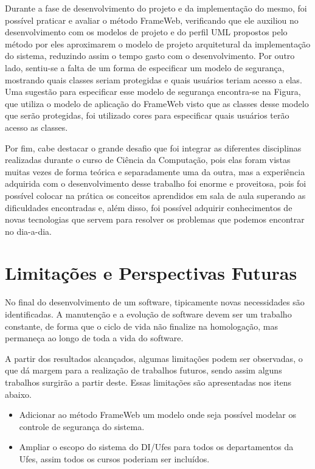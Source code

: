 Durante a fase de desenvolvimento do projeto e da implementação do mesmo, foi possível praticar e avaliar o método FrameWeb, verificando que ele auxiliou no desenvolvimento com os modelos de projeto e do perfil UML propostos pelo método por eles aproximarem o modelo de projeto arquitetural da implementação do sistema, reduzindo assim o tempo gasto com o desenvolvimento. Por outro lado, sentiu-se a falta de um forma de especificar um modelo de segurança, mostrando quais classes seriam protegidas e quais usuários teriam acesso a elas. Uma sugestão para especificar esse modelo de segurança encontra-se na Figura, que utiliza o modelo de aplicação do FrameWeb visto que as classes desse modelo que serão protegidas, foi utilizado cores para especificar quais usuários terão acesso as classes.


Por fim, cabe destacar o grande desafio que foi integrar as diferentes disciplinas realizadas durante o curso de Ciência da Computação, pois elas foram vistas muitas vezes de forma teórica e separadamente uma da outra, mas a experiência adquirida com o desenvolvimento desse trabalho foi enorme e proveitosa, pois foi possível colocar na prática os conceitos aprendidos em sala de aula superando as dificuldades encontradas e, além disso, foi possível adquirir conhecimentos de novas tecnologias que servem para resolver os problemas que podemos encontrar no dia-a-dia.




\section{Limitações e Perspectivas Futuras}
\label{sec-consideracoes-finais-limitacoes-perspectivas}

No final do desenvolvimento de um software, tipicamente novas necessidades são identificadas. A manutenção e a evolução de software devem ser um trabalho constante, de forma que o ciclo de vida não finalize na homologação, mas permaneça ao longo de toda a vida do software.

A partir dos resultados alcançados, algumas limitações podem ser observadas, o que dá margem para a realização de trabalhos futuros, sendo assim alguns trabalhos surgirão a partir deste. Essas limitações são apresentadas nos itens abaixo.

\begin{itemize}

	\item Adicionar ao método FrameWeb um modelo onde seja possível modelar os controle de segurança do sistema. 
	
	\item Ampliar o escopo do sistema do DI/Ufes para todos os departamentos da Ufes, assim todos os cursos poderiam ser incluídos.
	
\end{itemize}